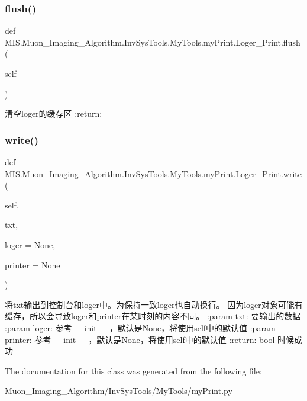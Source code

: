 \subsubsection{\texorpdfstring{flush()}{flush()}}
{\footnotesize\ttfamily def M\+I\+S.\+Muon\+\_\+\+Imaging\+\_\+\+Algorithm.\+Inv\+Sys\+Tools.\+My\+Tools.\+my\+Print.\+Loger\+\_\+\+Print.\+flush (\begin{DoxyParamCaption}\item[{}]{self }\end{DoxyParamCaption})}

\begin{DoxyVerb}清空loger的缓存区
:return:
\end{DoxyVerb}
 \mbox{\label{classMIS_1_1Muon__Imaging__Algorithm_1_1InvSysTools_1_1MyTools_1_1myPrint_1_1Loger__Print_a9c656a857e20530905b4e0ddd690772c}} 
\subsubsection{\texorpdfstring{write()}{write()}}
{\footnotesize\ttfamily def M\+I\+S.\+Muon\+\_\+\+Imaging\+\_\+\+Algorithm.\+Inv\+Sys\+Tools.\+My\+Tools.\+my\+Print.\+Loger\+\_\+\+Print.\+write (\begin{DoxyParamCaption}\item[{}]{self,  }\item[{}]{txt,  }\item[{}]{loger = {\ttfamily None},  }\item[{}]{printer = {\ttfamily None} }\end{DoxyParamCaption})}

\begin{DoxyVerb}将txt输出到控制台和loger中。为保持一致loger也自动换行。
因为loger对象可能有缓存，所以会导致loger和printer在某时刻的内容不同。
:param txt: 要输出的数据
:param loger: 参考__init__，默认是None，将使用self中的默认值
:param printer: 参考__init__，默认是None，将使用self中的默认值
:return: bool 时候成功
\end{DoxyVerb}
 

The documentation for this class was generated from the following file\+:\begin{DoxyCompactItemize}
\item 
Muon\+\_\+\+Imaging\+\_\+\+Algorithm/\+Inv\+Sys\+Tools/\+My\+Tools/my\+Print.\+py\end{DoxyCompactItemize}
